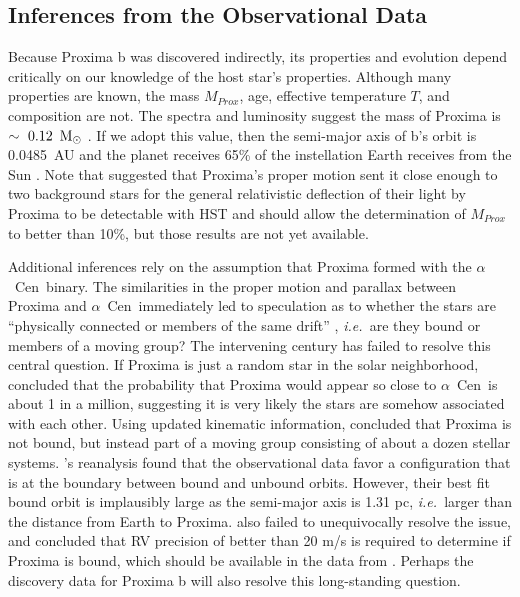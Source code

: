 \documentclass[preprint,12pt]{aastex}
\def\msun{{\rm\,M_\odot}}
\def\ie{{\it i.e.\ }}
\def\acen{{$\alpha$~Cen}}
\begin{document}
\subsection{Inferences from the Observational Data}
\label{sec:obs:inf}
Because Proxima b was discovered indirectly, its properties and
evolution depend critically on our knowledge of the host star's
properties. Although many properties are known, the mass $M_{Prox}$,
age, effective temperature $T$, and composition are not. The spectra and luminosity suggest
the mass of Proxima is $\sim~0.12~\msun$ \citep{Delfosse00}. If we
adopt this value, then the semi-major axis of b's orbit is 0.0485~AU
and the planet receives 65\% of the instellation Earth receives
from the Sun \citep{AngladaEscude16}.  Note that \cite{Sahu14}
suggested that Proxima's proper motion sent it close enough to two
background stars for the general relativistic deflection of their
light by Proxima to be detectable with HST and should allow the determination of
$M_{Prox}$ to better than 10\%, but those results are not yet available.

Additional inferences rely on the assumption that Proxima formed with
the \acen~binary.  The similarities in the proper motion and parallax
between Proxima and \acen~immediately led to speculation as to whether
the stars are ``physically connected or members of the same drift''
\citep{Voute1917}, \ie are they bound or members of a moving group?
The intervening century has failed to resolve this central
question. If Proxima is just a random star in the solar neighborhood,
\cite{MatthewsGilmore93} concluded that the probability that Proxima would
appear so close to \acen~is about 1 in a million, suggesting it is
very likely the stars are somehow associated with each other. Using
updated kinematic information, \cite{Anosova94} concluded that Proxima
is not bound, but instead part of a moving group consisting of about a
dozen stellar systems. \cite{WertheimerLaughlin06}'s reanalysis found
that the observational data favor a configuration that is at the
boundary between bound and unbound orbits. However, their best fit
bound orbit is implausibly large as the semi-major axis is 1.31 pc,
\ie larger than the distance from Earth to
Proxima. \cite{MatvienkoOrlov14} also failed to unequivocally resolve
the issue, and concluded that RV precision of better than 20 m/s is
required to determine if Proxima is bound, which should be available
in the data from \cite{AngladaEscude16}. Perhaps the discovery data
for Proxima b will also resolve this long-standing question.
\end{document}
